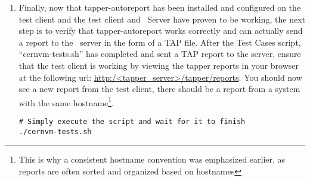 \begin{enumerate}
\item	Finally, now that tapper-autoreport has been installed and configured on the test client and the test client and \tapper~Server
		have proven to be working, the next step is to verify that tapper-autoreport works correctly and can actually send a report to 	
		the \tapper~server in the form of a TAP file. After the \cernvm Test Cases script, ``cernvm-tests.sh'' has completed and sent
		a TAP report to the server, ensure that the test client is working by viewing the tapper reports in your browser at the 
		following url: \url{http:/<tapper\_server>/tapper/reports}. You should now see a new report from the test client, there should be a 
		report from a system with the same hostname\footnote{This is why a consistent hostname convention was emphasized earlier, as 
		reports are often sorted and organized based on hostnames}.

\lstset{language=bash,caption=Run \tapper-AutoReport for CernVM Test Cases}
\begin{lstlisting}
# Simply execute the script and wait for it to finish
./cernvm-tests.sh
\end{lstlisting}
\end{enumerate}